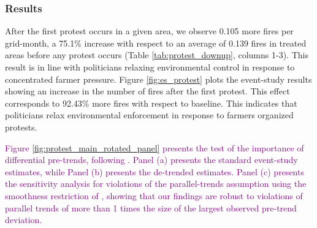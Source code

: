 \documentclass[12pt]{article}
\newcommand{\red}[1]{\textcolor{red}{#1}}
\begin{document}
\subsubsection{Results\label{sssec:results2}}


After the first protest occurs in a given area, we observe 0.105 more fires per grid-month, a 75.1\% increase with respect to an average of 0.139 fires in treated areas before any protest occurs (Table \ref{tab:protest_downup}, columns 1-3). This result is in line with politicians relaxing environmental control in response to concentrated farmer pressure.
Figure \ref{fig:es_protest} plots the event-study results showing an increase in the number of fires after the first protest. This effect corresponds to 92.43\% more fires with respect to baseline. This indicates that politicians relax environmental enforcement in response to farmers organized protests. %


\textcolor{purple}{Figure \ref{fig:protest_main_rotated_panel} presents the test of the importance of differential pre-trends, following \citet{dustmann2022reallocation}. Panel (a) presents the standard event-study estimates, while Panel (b) presents the de-trended estimates. Panel (c) presents the sensitivity analysis for violations of the parallel-trends assumption using the smoothness restriction of \citet{rambachan2023more}, showing that our findings are robust to violations of parallel trends of more than 1 times the size of the largest observed pre-trend deviation.}
\end{document}
